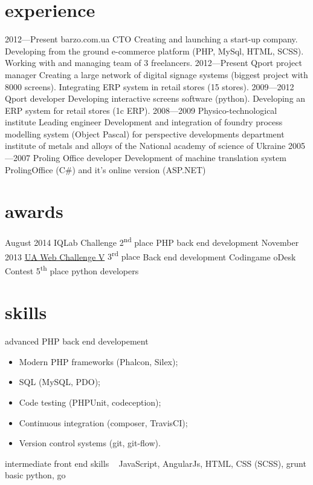 \documentclass[hidelinks,a4paper]{cv}
\begin{document}
\section{experience}

\begin{entrylist}
  \entry
    {2012—Present}
    {barzo.com.ua}
    {CTO}
    {Creating and launching a start-up company. Developing from the ground e-commerce platform (PHP, MySql, HTML, SCSS). Working with and managing team of 3 freelancers.
    }
  \entry
    {2012—Present}
    {Qport}
    {project manager}
    {
    Creating a large network of digital signage systems (biggest project with 8000 screens).
    Integrating ERP system in retail stores (15 stores).
    }
  \entry
    {2009—2012}
    {Qport}
    {developer}
    {
    Developing interactive screens software (python). 
    Developing an ERP system for retail stores (1c ERP).
    }
  \entry
    {2008—2009} 
    {Physico-technological institute}
    {Leading engineer}
    {Development and integration of foundry process modelling system (Object Pascal) for perspective developments department institute of metals and alloys of the National academy of science of Ukraine}
  \entry
    {2005—2007}
    {Proling Office}
    {developer}
    {Development of machine translation system ProlingOffice (C\#) and it's online version (ASP.NET)}
\end{entrylist}

\section{awards}

\begin{entrylist}
  \entry
   {August 2014}
   {IQLab Challenge}
   {2\textsuperscript{nd} place}
   {PHP back end development}
  \entry  
   {November 2013}
   {\href{http://uawebchallenge.com/news/v-final-results}{UA Web Challenge V}}
   {3\textsuperscript{rd} place}
   {Back end development}
  \entry  
   {}
   {Codingame oDesk Contest}
   {5\textsuperscript{th} place}
   {python developers}
\end{entrylist}

\newpage{}

\section{skills}
\begin{entrylist}
  \entry
   {advanced}
   {PHP back end developement}
   {~}
   {
   \begin{itemize}
      \item Modern PHP frameworks (Phalcon, Silex);
      \item SQL (MySQL, PDO);
      \item Code testing (PHPUnit, codeception);
      \item Continuous integration (composer, TravisCI);
      \item Version control systems (git, git-flow).
    \end{itemize}
   }
  \entry
   {intermediate}
   {front end skills}
   {~}
   {JavaScript, AngularJs, HTML, CSS (SCSS), grunt}
  \entry
   {basic}
   {python, go}
   {~}
   {~}
\end{entrylist}
\end{document}
